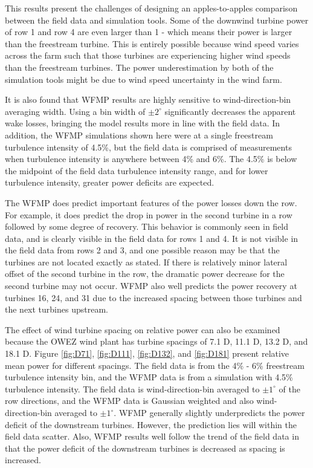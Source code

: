 \documentclass{umthesis}
\begin{document}
This results present the challenges of designing an apples-to-apples comparison between the field data and simulation tools. Some of the downwind turbine power of row 1 and row 4 are even larger than 1 - which means their power is larger than the freestream turbine. This is entirely possible because wind speed varies across the farm such that those turbines are experiencing higher wind speeds than the freestream turbines. The power underestimation by both of the simulation tools might be due to wind speed uncertainty in the wind farm.

It is also found that WFMP results are highly sensitive to wind-direction-bin averaging width. Using a bin width of $\pm2^\circ$ significantly decreases the apparent wake losses, bringing the model results more in line with the field data. In addition, the WFMP simulations shown here were at a single freestream turbulence intensity of 4.5\%, but the field data is comprised of measurements when turbulence intensity is anywhere between 4\% and 6\%. The 4.5\% is below the midpoint of the field data turbulence intensity range, and for lower turbulence intensity, greater power deficits are expected. 

The WFMP does predict important features of the power losses down the row. For example, it does predict the drop in power in the second turbine in a row followed by some degree of recovery. This behavior is commonly seen in field data, and is clearly visible in the field data for rows 1 and 4. It is not visible in the field data from rows 2 and 3, and one possible reason may be that the turbines are not located exactly as stated. If there is relatively minor lateral offset of the second turbine in the row, the dramatic power decrease for the second turbine may not occur. WFMP also well predicts the power recovery at turbines 16, 24, and 31 due to the increased spacing between those turbines and the next turbines upstream.

The effect of wind turbine spacing on relative power can also be examined because the OWEZ wind plant has turbine spacings of 7.1 D, 11.1 D, 13.2 D, and 18.1 D. Figure \ref{fig:D71}, \ref{fig:D111}, \ref{fig:D132}, and \ref{fig:D181} present relative mean power for different spacings. The field data is from the 4\% - 6\% freestream turbulence intensity bin, and the WFMP data is from a simulation with 4.5\% turbulence intensity. The field data is wind-direction-bin averaged to $\pm1^\circ$ of the row directions, and the WFMP data is Gaussian weighted and also wind-direction-bin averaged to $\pm1^\circ$. WFMP generally slightly underpredicts the power deficit of the downstream turbines. However, the prediction lies will within the field data scatter. Also, WFMP results well follow the trend of the field data in that the power deficit of the downstream turbines is decreased as spacing is increased.
\end{document}
